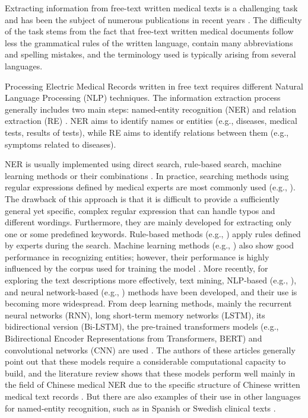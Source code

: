 Extracting information from free-text written medical texts is a challenging task and has been the subject of numerous publications in recent years \cite{lopez2020covid, wu2020attention, wang2020prediction, slater2021fast, kraljevic2021multi, percha2021modern}. The difficulty of the task stems from the fact that free-text written medical documents follow less the grammatical rules of the written language, contain many abbreviations and spelling mistakes, and the terminology used is typically arising from several languages.

Processing Electric Medical Records written in free text requires different Natural Language Processing (NLP) techniques. The information extraction process generally includes two main steps: named-entity recognition (NER) and relation extraction (RE) \cite{sun2018data}. NER aims to identify names or entities (e.g., diseases, medical tests, results of tests), while RE aims to identify relations between them (e.g., symptoms related to diseases).

NER is usually implemented using direct search, rule-based search, machine learning methods or their combinations \cite{grishman1996message}. In practice, searching methods using regular expressions defined by medical experts are most commonly used (e.g., \cite{cohen2019accuracy, fu2020extracting}). The drawback of this approach is that it is difficult to provide a sufficiently general yet specific, complex regular expression that can handle typos and different wordings. Furthermore, they are mainly developed for extracting only one or some predefined keywords. Rule-based methods (e.g., \cite{sahu2018rule, almeida2020rule}) apply rules defined by experts during the search. Machine learning methods (e.g., \cite{bao2019machine, spasic2020clinical}) also show good performance in recognizing entities; however, their performance is highly influenced by the corpus used for training the model \cite{kormilitzin2021med7}. More recently, for exploring the text descriptions more effectively, text mining, NLP-based (e.g., \cite{carchiolo2019medical, chilman2021text, viani2021natural}), and neural network-based (e.g., \cite{yang2019information, zhu2021utilizing}) methods have been developed, and their use is becoming more widespread. From deep learning methods, mainly the recurrent neural networks (RNN), long short-term memory networks (LSTM), its bidirectional version (Bi-LSTM), the pre-trained transformers models (e.g., Bidirectional Encoder Representations from Transformers, BERT) and convolutional networks (CNN) are used \cite{li2022entity, zhang2022medical}. The authors of these articles generally point out that these models require a considerable computational capacity to build, and the literature review shows that these models perform well mainly in the field of Chinese medical NER due to the specific structure of Chinese written medical text records \cite{chen2022named}. But there are also examples of their use in other languages for named-entity recognition, such as in Spanish or Swedish clinical texts \cite{weegar2019recent}.
 
